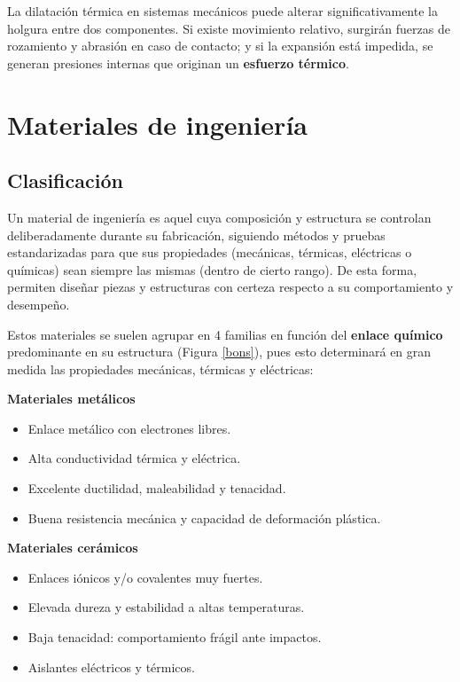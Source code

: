 La dilatación térmica en sistemas mecánicos puede alterar significativamente la holgura entre dos componentes. Si existe movimiento relativo, surgirán fuerzas de rozamiento y abrasión en caso de contacto; y si la expansión está impedida, se generan presiones internas que originan un \textbf{esfuerzo térmico}.

\section{Materiales de ingeniería}

\subsection{Clasificación}

Un material de ingeniería es aquel cuya composición y estructura se controlan deliberadamente durante su fabricación, siguiendo métodos y pruebas estandarizadas para que sus propiedades (mecánicas, térmicas, eléctricas o químicas) sean siempre las mismas (dentro de cierto rango). De esta forma, permiten diseñar piezas y estructuras con certeza respecto a su comportamiento y desempeño.

Estos materiales se suelen agrupar en 4 familias en función del \textbf{enlace químico} predominante en su estructura (Figura \ref{bons}), pues esto determinará en gran medida las propiedades mecánicas, térmicas y eléctricas:

\newpage

\textbf{Materiales metálicos}
    \begin{itemize}
      \item Enlace metálico con electrones libres.
      \item Alta conductividad térmica y eléctrica.
      \item Excelente ductilidad, maleabilidad y tenacidad.
      \item Buena resistencia mecánica y capacidad de deformación plástica.
    \end{itemize}

\textbf{Materiales cerámicos}
  
    \begin{itemize}
      \item Enlaces iónicos y/o covalentes muy fuertes.
      \item Elevada dureza y estabilidad a altas temperaturas.
      \item Baja tenacidad: comportamiento frágil ante impactos.
      \item Aislantes eléctricos y térmicos.
    \end{itemize}

